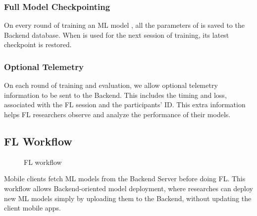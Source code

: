 \documentclass[letterpaper]{article} %
\begin{document}
\subsubsection{Full Model Checkpointing}
On every round of training an ML model \model,
all the parameters of \model{} is saved to the Backend database.
When \model{} is used for the next session of training,
its latest checkpoint is restored.

\subsubsection{Optional Telemetry}
On each round of training and evaluation,
we allow optional telemetry information to be sent to the Backend.
This includes the timing and loss,
associated with the FL session and the participants' ID.
This extra information helps FL researchers observe and analyze
the performance of their models.

\subsection{FL Workflow}

\begin{figure}
\centering
{}
\caption{FL workflow}
\label{fig:fl-workflow}
\end{figure}

Mobile clients fetch ML models from the Backend Server before doing FL.
This workflow allows Backend-oriented model deployment, where researches can
deploy new ML models simply by uploading them to the Backend,
without updating the client mobile apps.
\end{document}
